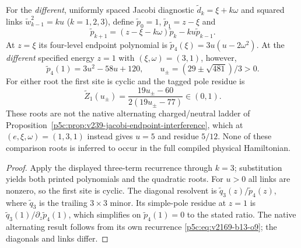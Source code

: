 \documentclass[11pt,a4paper]{article}
\begin{document}
\begin{proposition}
\label{p5c:prop:v245-uniform-jacobi-four-level-audit}
For the \emph{different}, uniformly spaced Jacobi diagnostic
$\widetilde d_k=\xi+k\omega$ and squared links
$\widetilde w_{k-1}^2=ku$ ($k=1,2,3$), define
$\widetilde p_0=1$, $\widetilde p_1=z-\xi$ and
\[
 \widetilde p_{k+1}=(z-\xi-k\omega)\widetilde p_k
 -ku\widetilde p_{k-1}.
\]
At $z=\xi$ its four-level endpoint polynomial is
$\widetilde p_4(\xi)=3u(u-2\omega^2)$.
At the \emph{different} specified energy $z=1$ with
$(\xi,\omega)=(3,1)$, however,
\[
 \boxed{\widetilde p_4(1)=3u^2-58u+120,
 \qquad u_\pm=(29\pm\sqrt{481})/3>0.}
\]
For either root the first site is cyclic and the tagged pole residue is
\[
 \boxed{\widetilde Z_{1}(u_\pm)
 =\frac{19u_\pm-60}{2(19u_\pm-77)}\in(0,1).}
\]
These roots are not the native alternating charged/neutral ladder
of Proposition~\ref{p5c:prop:v239-jacobi-endpoint-interference},
which at $(e,\xi,\omega)=(1,3,1)$ instead gives $u=5$
and residue $5/12$. None of these comparison roots is inferred to
occur in the full compiled physical Hamiltonian.
\end{proposition}
\begin{proof}
Apply the displayed three-term recurrence through $k=3$;
substitution yields both printed polynomials and the quadratic roots.
For $u>0$ all links are nonzero, so the first site is cyclic.
The diagonal resolvent is $\widetilde q_3(z)/\widetilde p_4(z)$,
where $\widetilde q_3$ is the trailing $3\times3$ minor.
Its simple-pole residue at $z=1$ is
$\widetilde q_3(1)/\partial_z\widetilde p_4(1)$,
which simplifies on $\widetilde p_4(1)=0$ to the stated ratio.
The native alternating result follows from its own recurrence
\eqref{p5c:eq:v2169-b13-o9}; the diagonals and links differ.
\end{proof}






\end{document}
